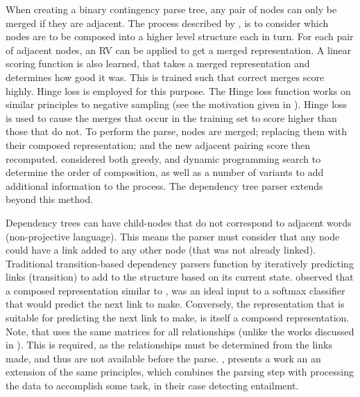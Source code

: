 \documentclass[12pt,parskip]{komatufte}
\begin{document}

When creating a binary contingency parse tree, any pair of nodes can only be merged if they are adjacent.
The process described by \textcite{socher2010PhraseEmbedding}, is to consider which nodes are to be composed into a higher level structure each in turn.
For each pair of adjacent nodes, an RV can be applied to get a merged representation.
A linear scoring function is also learned, that takes a merged representation and determines how good it was.
This is trained such that correct merges score highly.
Hinge loss is employed for this purpose.
The Hinge loss  function works on similar principles to negative sampling (see the motivation given in ).
Hinge loss is used to cause the merges that occur in the training set to score higher than those that do not.
To perform the parse, nodes are merged;
replacing them with their composed representation;
 and the new adjacent pairing score then recomputed.
\textcite{socher2010PhraseEmbedding} considered both greedy, and dynamic programming search to determine the order of composition, as well as a number of variants to add additional information to the process.
The dependency tree parser extends beyond this method.


Dependency trees can have child-nodes that do not correspond to adjacent words (non-projective language).
This means the parser must consider that any node could have a link added to any other node (that was not already linked).
Traditional transition-based dependency parsers function by iteratively predicting links (transition) to add to the structure based on its current state.
\textcite{stenetorp2013transition}  observed that a composed representation similar to , was an ideal input to a softmax classifier that would predict the next link to make.
Conversely, the representation that is suitable for predicting the next link to make, is itself a composed representation.
Note, that \textcite{stenetorp2013transition} uses the same matrices for all relationships (unlike the works discussed in ).
This is required, as the relationships must be determined from the links made, and thus are not available before the parse.
, presents a work an an extension of the same principles, which combines the parsing step with processing the data to accomplish some task, in their case detecting entailment.
\end{document}
